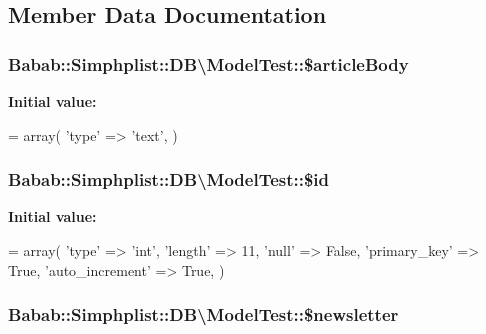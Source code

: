 \subsection{Member Data Documentation}
\hypertarget{classBabab_1_1Simphplist_1_1DB_1_1ModelTest_af8a50d406da8bc9621d8419b9dca3b8b}{
\subsubsection[{\$article\+Body}]{\setlength{\rightskip}{0pt plus 5cm}Babab\+::\+Simphplist\+::\+D\+B\textbackslash{}\+Model\+Test\+::\$article\+Body}}\label{classBabab_1_1Simphplist_1_1DB_1_1ModelTest_af8a50d406da8bc9621d8419b9dca3b8b}
{\bfseries Initial value\+:}
\begin{DoxyCode}
= array(
        \textcolor{stringliteral}{'type'} => \textcolor{stringliteral}{'text'},
    )
\end{DoxyCode}
\hypertarget{classBabab_1_1Simphplist_1_1DB_1_1ModelTest_a74473b58bab06575c6ed288d1058bcba}{
\subsubsection[{\$id}]{\setlength{\rightskip}{0pt plus 5cm}Babab\+::\+Simphplist\+::\+D\+B\textbackslash{}\+Model\+Test\+::\$id}}\label{classBabab_1_1Simphplist_1_1DB_1_1ModelTest_a74473b58bab06575c6ed288d1058bcba}
{\bfseries Initial value\+:}
\begin{DoxyCode}
= array(
        \textcolor{stringliteral}{'type'} => \textcolor{stringliteral}{'int'},
        \textcolor{stringliteral}{'length'} => 11,
        \textcolor{stringliteral}{'null'} => False,
        \textcolor{stringliteral}{'primary\_key'} => True,
        \textcolor{stringliteral}{'auto\_increment'} => True,
    )
\end{DoxyCode}
\hypertarget{classBabab_1_1Simphplist_1_1DB_1_1ModelTest_afb73d61c30e855d47420a5ae76966c20}{
\subsubsection[{\$newsletter}]{\setlength{\rightskip}{0pt plus 5cm}Babab\+::\+Simphplist\+::\+D\+B\textbackslash{}\+Model\+Test\+::\$newsletter}}\label{classBabab_1_1Simphplist_1_1DB_1_1ModelTest_afb73d61c30e855d47420a5ae76966c20}
